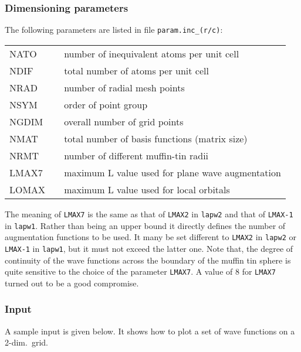 \documentclass[10pt,fleqn,a4paper,twosided]{article}
\begin{document}
\subsubsection{Dimensioning parameters}

The following parameters are listed in file {\tt param.inc\_(r/c)}:

\vspace*{.25cm}
\begin{tabular}{lll}
NATO  & & number of inequivalent atoms per unit cell \\[-.0ex]
NDIF  & & total number of atoms per unit cell \\[-.0ex]
NRAD  & & number of radial mesh points \\[-.0ex]
NSYM  & & order of point group \\[-.0ex]
NGDIM & & overall number of grid points \\[-.0ex]
NMAT  & & total number of basis functions (matrix size) \\[-.0ex]
NRMT  & & number of different muffin-tin radii \\ [-.0ex]
LMAX7 & & maximum L value used for plane wave augmentation \\[-.0ex]
LOMAX & & maximum L value used for local orbitals \\
\end{tabular}
\vspace*{.25cm}

The meaning of {\tt LMAX7} is the same as that of {\tt LMAX2} in 
{\tt lapw2} and that of {\tt LMAX-1} in {\tt lapw1}. Rather than being 
an upper bound it directly defines the number of augmentation functions 
to be used. It many be set different to {\tt LMAX2} in {\tt lapw2} or 
{\tt LMAX-1} in {\tt lapw1}, but it must not exceed the latter one.
Note that, the degree of continuity of the wave functions across the boundary
of the muffin tin sphere is quite sensitive to the choice of the parameter 
{\tt LMAX7}. A value of 8 for {\tt LMAX7} turned out to be a good compromise.


\subsubsection{Input}

A sample input is given below. It shows how to plot a set of wave 
functions on a 2-dim.\ grid.
\end{document}

